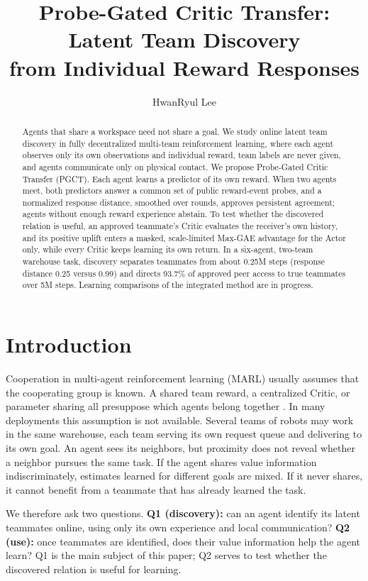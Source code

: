 \documentclass{article}
\title{Probe-Gated Critic Transfer: Latent Team Discovery\\from Individual Reward Responses}
\author{HwanRyul Lee}
\begin{document}
\maketitle

\begin{abstract}
Agents that share a workspace need not share a goal. We study online latent team discovery in fully decentralized multi-team reinforcement learning, where each agent observes only its own observations and individual reward, team labels are never given, and agents communicate only on physical contact. We propose Probe-Gated Critic Transfer (PGCT). Each agent learns a predictor of its own reward. When two agents meet, both predictors answer a common set of public reward-event probes, and a normalized response distance, smoothed over rounds, approves persistent agreement; agents without enough reward experience abstain. To test whether the discovered relation is useful, an approved teammate's Critic evaluates the receiver's own history, and its positive uplift enters a masked, scale-limited Max-GAE advantage for the Actor only, while every Critic keeps learning its own return. In a six-agent, two-team warehouse task, discovery separates teammates from about 0.25M steps (response distance 0.25 versus 0.99) and directs 93.7\% of approved peer access to true teammates over 5M steps. Learning comparisons of the integrated method are in progress.
\end{abstract}

\section{Introduction}
Cooperation in multi-agent reinforcement learning (MARL) usually assumes that the cooperating group is known. A shared team reward, a centralized Critic, or parameter sharing all presuppose which agents belong together \cite{mappo,seps}. In many deployments this assumption is not available. Several teams of robots may work in the same warehouse, each team serving its own request queue and delivering to its own goal. An agent sees its neighbors, but proximity does not reveal whether a neighbor pursues the same task. If the agent shares value information indiscriminately, estimates learned for different goals are mixed. If it never shares, it cannot benefit from a teammate that has already learned the task.

We therefore ask two questions. \textbf{Q1 (discovery):} can an agent identify its latent teammates online, using only its own experience and local communication? \textbf{Q2 (use):} once teammates are identified, does their value information help the agent learn? Q1 is the main subject of this paper; Q2 serves to test whether the discovered relation is useful for learning.
\end{document}
